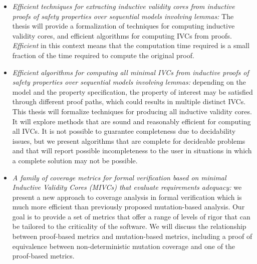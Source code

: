 \begin{itemize}
    \item \emph{Efficient techniques for extracting inductive validity cores from inductive proofs of safety properties over sequential models involving lemmas:} The thesis will provide a formalization of techniques for computing inductive validity cores, and efficient algorithms for computing IVCs from proofs.  {\em Efficient} in this context means that the computation time required is a small fraction of the time required to compute the original proof.
    \item \emph{Efficient algorithms for computing all minimal IVCs from inductive proofs of safety properties over sequential models involving lemmas:} depending on the model and the property specification, the property of interest may be satisfied through different proof paths, which could results in multiple distinct IVCs. This thesis will formalize techniques for producing all inductive validity cores.  It will explore methods that are sound and reasonably efficient for computing all IVCs.  It is not possible to guarantee completeness due to decidability issues, but we present algorithms that are complete for decideable problems and that will report possible incompleteness to the user in situations in which a complete solution may not be possible.
   \item \emph{A family of coverage metrics for formal verification based on \emph{minimal} Inductive Validity Cores (MIVCs) that evaluate requirements adequacy:} we present a new approach to coverage analysis in formal verification which is much more efficient than previously proposed mutation-based analysis. Our goal is to provide a set of metrics that offer a range of levels of rigor that can be tailored to the criticality of the software. We will discuss the relationship between proof-based metrics and mutation-based metrics, including a proof of equivalence between non-deterministic mutation coverage and one of the proof-based metrics.

\end{itemize}
